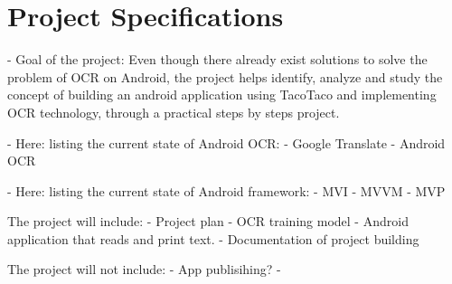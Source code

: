 
\chapter{Project Specifications}

- Goal of the project: Even though there already exist solutions to solve the problem of OCR on Android, the project helps identify, analyze and study the concept of building an android application using TacoTaco and implementing OCR technology, through a practical steps by steps project.

- Here: listing the current state of Android OCR:
    - Google Translate
    - Android OCR
    
- Here: listing the current state of Android framework:
    - MVI
    - MVVM
    - MVP

The project will include:
- Project plan
- OCR training model
- Android application that reads and print text.
- Documentation of project building

The project will not include:
- App publisihing?
- 

\clearpage %
